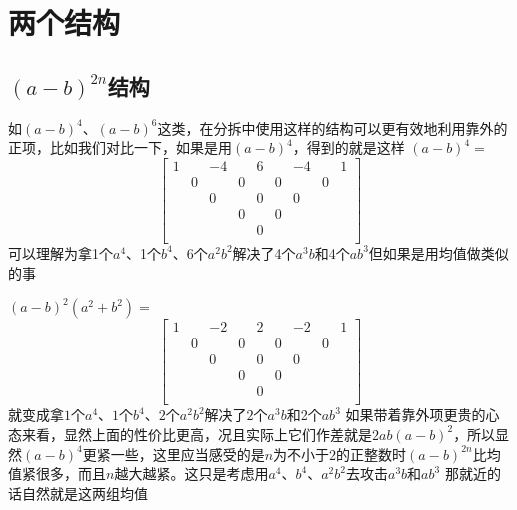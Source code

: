\documentclass[UTF8]{ctexart}
\begin{document}
\section{两个结构}
\subsection{$ (a-b)^{2n}$结构}
如$ (a-b)^{4} $、$ (a-b)^{6} $这类，在分拆中使用这样的结构可以更有效地利用靠外的正项，比如我们对比一下，如果是用$ (a-b)^{4} $，得到的就是这样
$ (a-b)^{4}= $
\renewcommand*{\arraystretch}{1.732}\[\left[\begin{matrix}
	1& &-4& &6& &-4& &1\\
	&0& &0& &0& &0&\\
	& &0& &0& &0& &\\
	& & &0& &0& & &\\
	& & & &0& & & &\\
\end{matrix}\right]\]
可以理解为拿1个$ a^{4} $、1个$ b^{4} $、6个$ a^{2}b^{2} $解决了4个$ a^{3}b $和4个$ ab^{3} $但如果是用均值做类似的事

$ (a-b)^{2}(a^{2}+b^{2})= $
\renewcommand*{\arraystretch}{1.732}\[\left[\begin{matrix}
	1& &-2& &2& &-2& &1\\
	&0& &0& &0& &0&\\
	& &0& &0& &0& &\\
	& & &0& &0& & &\\
	& & & &0& & & &\\
\end{matrix}\right]\]
就变成拿$ 1 $个$ a^{4} $、$ 1 $个$ b^{4} $、$ 2 $个$ a^{2}b^{2} $解决了$ 2 $个$ a^{3}b $和2个$ ab^{3} $
如果带着靠外项更贵的心态来看，显然上面的性价比更高，况且实际上它们作差就是$ 2ab(a-b)^{2} $，所以显然$ (a-b)^{4} $更紧一些，这里应当感受的是$ n $为不小于$ 2 $的正整数时$ (a-b)^{2n} $比均值紧很多，而且$ n $越大越紧。这只是考虑用$ a^{4} $、$ b^{4} $、$ a^{2}b^{2} $去攻击$ a^{3}b $和$ ab^{3} $
那就近的话自然就是这两组均值\\
\end{document}
